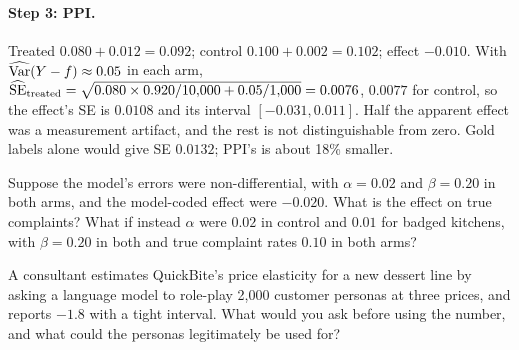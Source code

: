 \documentclass[11pt]{article}
\begin{document}
\paragraph{Step 3: PPI.} Treated $0.080 + 0.012 = 0.092$; control $0.100 + 0.002 = 0.102$; effect $-0.010$. With $\widehat{\operatorname{Var}}(Y - f) \approx 0.05$ in each arm,
$\widehat{\operatorname{SE}}_{\text{treated}} = \sqrt{0.080 \times 0.920/10{,}000 + 0.05/1{,}000} = 0.0076$, $0.0077$ for control, so the effect's SE is $0.0108$ and its
interval $[-0.031, 0.011]$. Half the apparent effect was a measurement artifact, and the rest is not distinguishable from zero. Gold labels
alone would give SE $0.0132$; PPI's is about 18\% smaller.

\begin{exercise}[computation]
Suppose the model's errors were non-differential, with $\alpha = 0.02$ and $\beta = 0.20$ in both arms, and the model-coded effect were $-0.020$.
What is the effect on true complaints? What if instead $\alpha$ were $0.02$ in control and $0.01$ for badged kitchens, with $\beta = 0.20$ in both and
true complaint rates $0.10$ in both arms?
\end{exercise}

\begin{exercise}[judgment]
A consultant estimates QuickBite's price elasticity for a new dessert line by asking a language model to role-play 2{,}000 customer personas
at three prices, and reports $-1.8$ with a tight interval. What would you ask before using the number, and what could the personas legitimately
be used for?
\end{exercise}

\sectionthree
\end{document}
